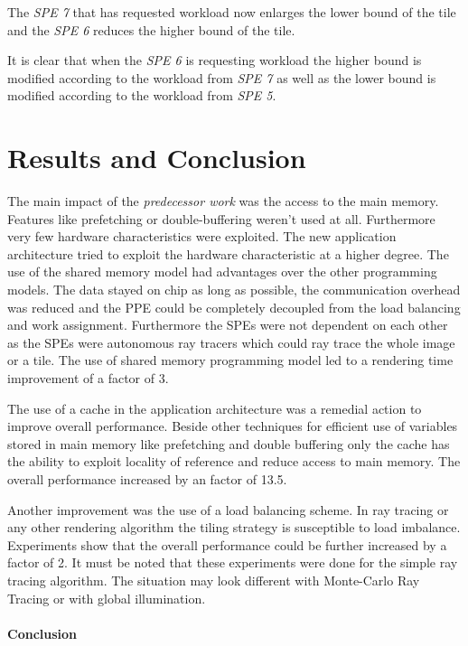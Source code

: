 \documentclass[DIV10, abstracton, openright, footsepline, headsepline, twoside, 9pt,
bigheadings]{scrreprt}
\begin{document}
The \textit{SPE 7} that has requested workload now enlarges the lower bound of the
tile and the \textit{SPE 6} reduces the higher bound of the tile.

It is clear that when the \textit{SPE 6} is requesting workload the higher bound
is modified according to the workload from \textit{SPE 7} as well as the lower
bound is modified according to the workload from \textit{SPE 5}.


\chapter{Results and Conclusion}

The main impact of the \textit{predecessor work} was the access to the main memory.
Features like prefetching or double-buffering weren't used at all. Furthermore
very few hardware characteristics were exploited.
The new application architecture tried to exploit the hardware characteristic
at a higher degree. The use of the shared memory model had advantages over
the other programming models. The data stayed on chip as long as possible, the
communication overhead was reduced and the PPE could be completely decoupled from
the load balancing and work assignment. Furthermore the SPEs were not dependent
on each other as the SPEs were autonomous ray tracers which could ray trace
the whole image or a tile. The use of shared memory programming model led to a rendering time improvement of a factor of 3.

The use of a cache in the application architecture was a remedial action to improve
overall performance. Beside other techniques for efficient use of variables stored
in main memory like prefetching and double buffering only the cache has the ability
to exploit locality of reference and reduce access to main memory. The overall
performance increased by an factor of 13.5.

Another improvement was the use of a load balancing scheme. In ray tracing or any
other rendering algorithm the tiling strategy is susceptible to load imbalance.
Experiments show that the overall performance could be further increased by a
factor of 2. It must be noted that these experiments were done for the simple
ray tracing algorithm. The situation may look different with Monte-Carlo Ray Tracing
or with global illumination.

\subsubsection*{Conclusion}
\end{document}
